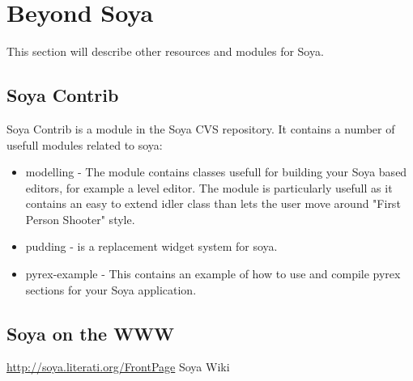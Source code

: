 \section{Beyond Soya}

This section will describe other resources and modules for Soya. 

\subsection{Soya Contrib}
Soya Contrib is a module in the Soya CVS repository. It contains 
a number of usefull modules related to soya:

\begin{itemize}
  \item modelling - The  module contains classes 
  usefull for building your Soya based editors, for example a level editor. 
  The module  is particularly usefull
  as it contains an easy to extend idler class than lets the user 
  move around "First Person Shooter" style. 

  \item pudding -  is a replacement widget system for soya. 

  \item pyrex-example - This contains an example of how to use and compile 
  pyrex sections for your Soya application. 
\end{itemize}

\begin{seealso}
\end{seealso}

\subsection{Soya on the WWW}

\url{http://soya.literati.org/FrontPage} Soya Wiki
